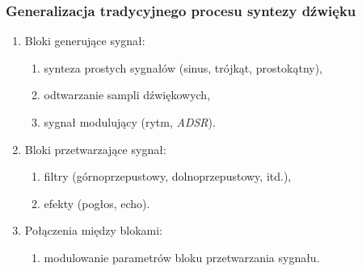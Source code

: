\documentclass[]{beamer}
\begin{document}
\begin{frame}
  \frametitle{Generalizacja tradycyjnego procesu syntezy dźwięku}

  \begin{enumerate}
    \item Bloki generujące sygnał:
      \begin{enumerate}
        \item synteza prostych sygnałów (sinus, trójkąt, prostokątny),
        \item odtwarzanie sampli dźwiękowych,
        \item sygnał modulujący (rytm, \textit{ADSR}).
      \end{enumerate}
    \item Bloki przetwarzające sygnał:
      \begin{enumerate}
        \item filtry (górnoprzepustowy, dolnoprzepustowy, itd.),
        \item efekty (pogłos, echo).
      \end{enumerate}
    \item Połączenia między blokami:
      \begin{enumerate}
        \item modulowanie parametrów bloku przetwarzania sygnału.
      \end{enumerate}
  \end{enumerate}
\end{frame}
\end{document}
